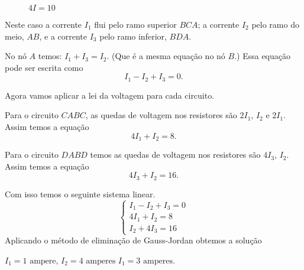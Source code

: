 \documentclass{beamer}
\begin{document}
    \begin{frame}
        \begin{figure}[!h]
            \centering
            
            \caption{$4I = 10$}
        \end{figure}
    \end{frame}

    \begin{frame}
        \begin{figure}[!h]
            \centering
            
        \end{figure}
    \end{frame}

    \begin{frame}
        Neste caso a corrente $I_1$ flui pelo ramo superior $BCA$; a corrente $I_2$ pelo ramo do meio, $AB$, e a corrente $I_3$ pelo ramo inferior, $BDA$.

        No nó $A$ temos: $I_1 + I_3 = I_2$. (Que é a mesma equação no nó $B$.) Essa equação pode ser escrita como
        \[
            I_1 - I_2 + I_3 = 0.
        \]
    \end{frame}

    \begin{frame}
        Agora vamos aplicar a lei da voltagem para cada circuito.

        Para o circuito $CABC$, as quedas de voltagem nos resistores são $2I_1$, $I_2$ e $2I_1$. Assim temos a equação
        \[
            4I_1 + I_2 = 8.
        \]

        Para o circuito $DABD$ temos as quedas de voltagem nos resistores são $4I_3$, $I_2$. Assim temos a equação
        \[
            4I_3 + I_2 = 16.
        \]

    \end{frame}

    \begin{frame}
        Com isso temos o seguinte sistema linear.
        \[
            \begin{cases}
                I_1 - I_2 + I_3 = 0\\
                4I_1 + I_2 = 8\\
                I_2 + 4I_3 = 16
            \end{cases}
        \]
        Aplicando o método de eliminação de Gauss-Jordan obtemos a solução
        \begin{center}
            $I_1 = 1 \mbox{ ampere}$, $I_2 = 4 \mbox{ amperes}$ $I_1 = 3 \mbox{ amperes}$.
        \end{center}
    \end{frame}
\end{document}
